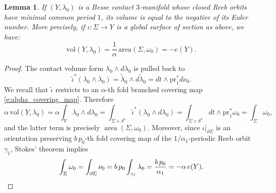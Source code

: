 \documentclass[10pt,a4paper]{article}
\newtheorem{lem}[thm]{Lemma}
\theoremstyle{definition}
\DeclareMathOperator{\area}{area}
\newcommand{\vol}{\mathrm{vol}}
\newcommand{\pr}{\mathrm{pr}}
\let\eul e
\let\diff d
\begin{document}
\begin{lem}
\label{l:volume_Besse}
If $(Y,\lambda_0)$ is a Besse contact $3$-manifold whose closed Reeb orbits have minimal common period $1$, its volume is equal to the negative of its Euler number. More precisely, if $\iota: \Sigma \to Y$ is a global surface of section as above, we have:
\[
\mathrm{vol}(Y,\lambda_0) = \frac{1}{\alpha}\, \mathrm{area}(\Sigma,\omega_0) = -\eul(Y).
\]
\end{lem}

\begin{proof}
The contact volume form $\lambda_0\wedge\diff\lambda_0$ is pulled back to
\[
\tilde\iota^*(\lambda_0\wedge\lambda_0)
=
\tilde\lambda_0\wedge\diff\tilde\lambda_0
=
\diff t\wedge\pr_1^*\diff\nu_0.
\]
We recall that $\tilde\iota$ restricts to an $\alpha$-th fold branched covering map \eqref{e:alpha_covering_map}. Therefore
\[
\alpha\,\vol(Y,\lambda_0)
=
\alpha
\int_{Y}\lambda_0\wedge\diff\lambda_0
=
\int_{\Sigma\times S^1} \!\!\!\tilde\iota^*(\lambda_0\wedge\diff\lambda_0)
=
\int_{\Sigma\times S^1} \!\!\! \diff t\wedge \pr_1^*\omega_0
=\int_\Sigma \omega_0,
\]
and the latter term is precisely $\area(\Sigma,\omega_0)$. Moreover, since $\iota|_{\partial\Sigma}$ is an orientation preserving $b\,p_0$-th fold covering map of the $1/\alpha_1$-periodic Reeb orbit $\gamma_1$, Stokes' theorem implies
\[
\int_\Sigma \omega_0
=\int_{\partial\Sigma} \nu_0
=
b\,p_0\int_{\gamma_1} \lambda_0
=
\frac{b\,p_0}{\alpha_1}
=
-\alpha\, \eul(Y)
.
\qedhere
\]
\end{proof}
\end{document}
